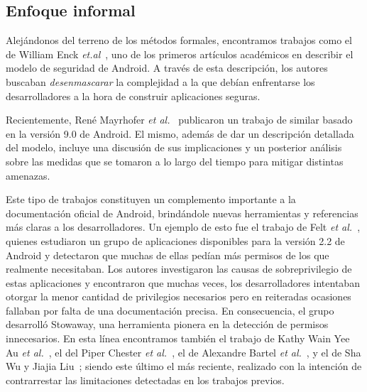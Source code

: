\subsection*{Enfoque informal}

Alejándonos del terreno de los métodos formales, encontramos trabajos como el de
William Enck \textit{et.al}~\cite{enck}, uno de los primeros artículos académicos
en describir el modelo de seguridad de Android. A través de esta descripción, los
autores buscaban \textit{desenmascarar} la complejidad a la que debían enfrentarse
%
%
los desarrolladores a la hora de construir aplicaciones seguras.

Recientemente, René Mayrhofer \textit{et al.}~\cite{mayrhofer} publicaron un
%
%
trabajo de similar basado en la versión 9.0 de Android. El mismo, además de dar
un descripción detallada del modelo, incluye una discusión de sus implicaciones
y un posterior análisis sobre las medidas que se tomaron a lo largo del tiempo
para mitigar distintas amenazas.

Este tipo de trabajos constituyen un complemento importante a la documentación
oficial de Android,
%
%
brindándole nuevas herramientas y referencias más claras a los desarrolladores.
Un ejemplo de esto fue el trabajo de Felt \textit{et al.}~\cite{felt}, quienes
estudiaron un grupo de aplicaciones disponibles para la versión 2.2 de Android y
detectaron que muchas de ellas pedían más permisos de los que realmente
necesitaban. Los autores investigaron las causas de sobreprivilegio de estas
aplicaciones y encontraron que muchas veces, los desarrolladores intentaban
otorgar la menor cantidad de privilegios necesarios pero en reiteradas ocasiones
fallaban por falta de una documentación precisa. En consecuencia, el grupo
desarrolló Stowaway, una herramienta pionera en la detección de permisos
innecesarios. En esta línea encontramos también el trabajo de Kathy Wain Yee Au
\textit{et al.}~\cite{pscout}, el del Piper Chester \textit{et
al.}~\cite{mperm}, el de Alexandre Bartel \textit{et al.}~\cite{bartel}, y el de
Sha Wu y Jiajia Liu~\cite{droidtector}; siendo este último el más reciente,
realizado con la intención de contrarrestar las limitaciones detectadas en los
trabajos previos.
%
%

